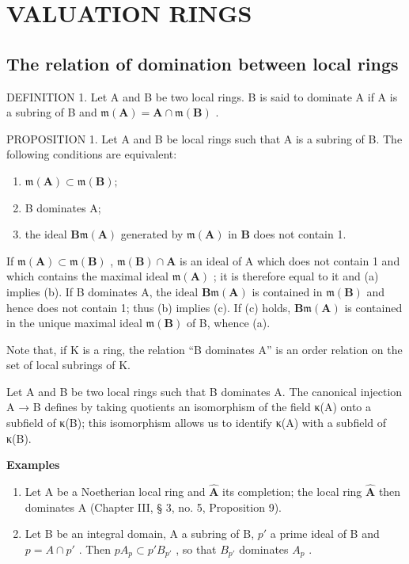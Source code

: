 \section{VALUATION RINGS}

\subsection{The relation of domination between local rings}

DEFINITION 1. Let A and B be two local rings. B is said to dominate A if A is a subring of B and \(\mathfrak{m}(\mathbf{A}) = \mathbf{A} \cap \mathfrak{m}(\mathbf{B})\) .

PROPOSITION 1. Let A and B be local rings such that A is a subring of B. The following conditions are equivalent:

\begin{enumerate}
\def\labelenumi{(\alph{enumi})}
\item
  \(\mathfrak{m}(\mathbf{A}) \subset \mathfrak{m}(\mathbf{B});\)
\item
  B dominates A;
\item
  the ideal \(\mathbf{B}\mathfrak{m}(\mathbf{A})\) generated by \(\mathfrak{m}(\mathbf{A})\) in \(\mathbf{B}\) does not contain 1.
\end{enumerate}

If \(\mathfrak{m}(\mathbf{A}) \subset \mathfrak{m}(\mathbf{B})\) , \(\mathfrak{m}(\mathbf{B}) \cap \mathbf{A}\) is an ideal of A which does not contain 1 and which contains the maximal ideal \(\mathfrak{m}(\mathbf{A})\) ; it is therefore equal to it and (a) implies (b). If B dominates A, the ideal \(\mathbf{B}\mathfrak{m}(\mathbf{A})\) is contained in \(\mathfrak{m}(\mathbf{B})\) and hence does not contain 1; thus (b) implies (c). If (c) holds, \(\mathbf{B}\mathfrak{m}(\mathbf{A})\) is contained in the unique maximal ideal \(\mathfrak{m}(\mathbf{B})\) of B, whence (a).

Note that, if K is a ring, the relation ``B dominates A'' is an order relation on the set of local subrings of K.

Let A and B be two local rings such that B dominates A. The canonical injection A → B defines by taking quotients an isomorphism of the field κ(A) onto a subfield of κ(B); this isomorphism allows us to identify κ(A) with a subfield of κ(B).

\textbf{Examples}\par

\begin{enumerate}
\def\labelenumi{(\arabic{enumi})}
\item
  Let A be a Noetherian local ring and \(\hat{\mathbf{A}}\) its completion; the local ring \(\hat{\mathbf{A}}\) then dominates A (Chapter III, § 3, no. 5, Proposition 9).
\item
  Let B be an integral domain, A a subring of B, \(p'\) a prime ideal of B and \(p = A \cap p'\) . Then \(pA_{p} \subset p'B_{p'}\) , so that \(B_{p'}\) dominates \(A_{p}\) .
\end{enumerate}

